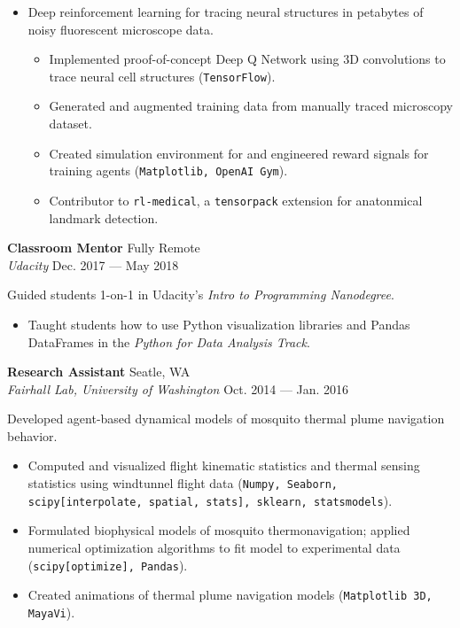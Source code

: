 \documentclass[a4paper,12pt]{article}
\newcommand{\ressubheading}[4]{{\begin{minipage}{\textwidth}
        \textbf{#1} \hfill #2 \\
        \textit{#3} \hfill #4 \\
        \end{minipage}}}
\begin{document}
\begin{itemize}
\item Deep reinforcement learning for tracing neural structures in petabytes of noisy fluorescent microscope data.

\begin{itemize}
\item Implemented proof-of-concept Deep Q Network using 3D convolutions to trace neural cell structures (\texttt{TensorFlow}).
\item Generated and augmented training data from manually traced microscopy dataset.
\item Created simulation environment for and engineered reward signals for training agents (\texttt{Matplotlib, OpenAI Gym}).
\item Contributor to \texttt{rl-medical}, a \texttt{tensorpack} extension for anatonmical landmark detection.
\end{itemize}

\end{itemize}

    \ressubheading{Classroom Mentor}{Fully Remote}{Udacity}{Dec. 2017 --- May 2018}
    
    Guided students 1-on-1 in Udacity's \textit{Intro to Programming Nanodegree}.
    \begin{itemize}
    \item Taught students how to use Python visualization libraries and Pandas DataFrames in the \textit{Python for Data Analysis Track}.
    \end{itemize}


\ressubheading{Research Assistant}{Seatle, WA}{Fairhall Lab, University of Washington}{Oct. 2014 --- Jan. 2016}

\vspace{-6pt} Developed agent-based dynamical models of mosquito thermal plume navigation behavior.

\begin{itemize}
\item Computed and visualized flight kinematic statistics and thermal sensing statistics using windtunnel flight data (\texttt{Numpy, Seaborn, scipy[interpolate, spatial, stats], sklearn, statsmodels}).
\item Formulated biophysical models of mosquito thermonavigation; applied numerical optimization algorithms to fit model to experimental data (\texttt{scipy[optimize], Pandas}).
\item Created animations of thermal plume navigation models (\texttt{Matplotlib 3D, MayaVi}).
\end{itemize}
\end{document}
